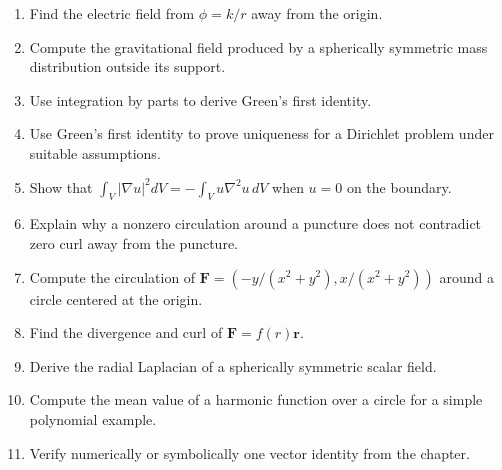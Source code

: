 \begin{enumerate}[label=\textbf{\arabic*.},leftmargin=*]
\item Find the electric field from $\phi=k/r$ away from the origin.
\item Compute the gravitational field produced by a spherically symmetric mass distribution outside its support.
\item Use integration by parts to derive Green's first identity.
\item Use Green's first identity to prove uniqueness for a Dirichlet problem under suitable assumptions.
\item Show that $\int_V |\nabla u|^2dV=-\int_V u\nabla^2u\,dV$ when $u=0$ on the boundary.
\item Explain why a nonzero circulation around a puncture does not contradict zero curl away from the puncture.
\item Compute the circulation of $\mathbf F=(-y/(x^2+y^2),x/(x^2+y^2))$ around a circle centered at the origin.
\item Find the divergence and curl of $\mathbf F=f(r)\mathbf r$.
\item Derive the radial Laplacian of a spherically symmetric scalar field.
\item Compute the mean value of a harmonic function over a circle for a simple polynomial example.
\item Verify numerically or symbolically one vector identity from the chapter.
\end{enumerate}
